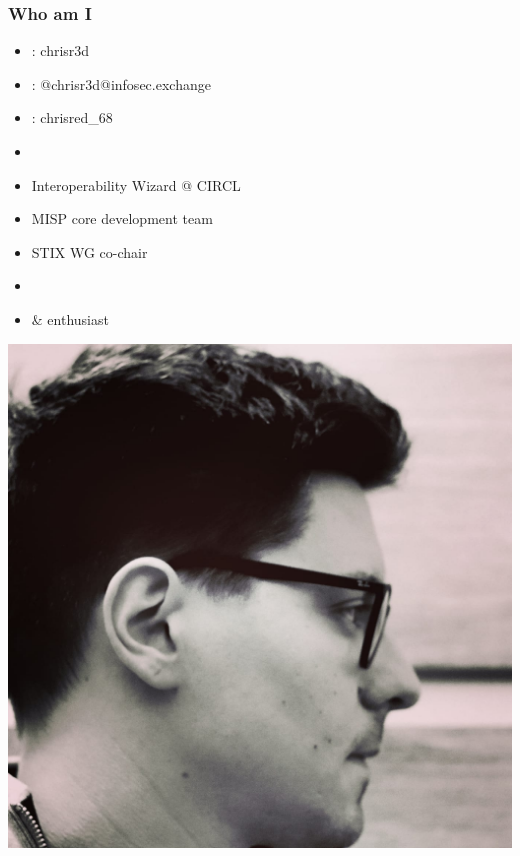 
\begin{frame}[t,plain]
\titlepage
\end{frame}

\begin{frame}
    \frametitle{Who am I}
    \begin{minipage}{0.6\textwidth}
        \begin{itemize}
            \item \faGithub : chrisr3d \\
            \item \faMastodon : @chrisr3d@infosec.exchange
            \item \faTwitter : chrisred\_68
            \item []
            \item Interoperability Wizard @ CIRCL
            \item MISP core development team
            \item STIX WG co-chair
            \item []
            \item \faCat \vspace{1em} \& \faCamera \vspace{1em} enthusiast
        \end{itemize}
    \end{minipage}%
    \begin{minipage}{0.4\textwidth}
        \includegraphics[scale=0.1]{images/profile_picture.jpg}
    \end{minipage}
\end{frame}


